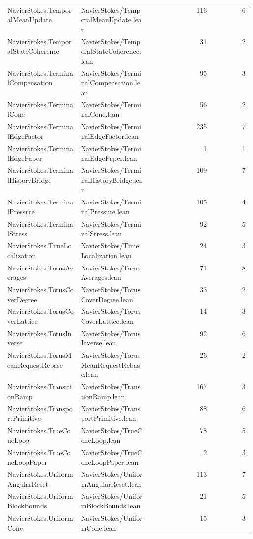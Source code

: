 \begin{longtable}{p{0.30\linewidth}p{0.28\linewidth}rr}
NavierStokes.TemporalMeanUpdate & NavierStokes/TemporalMeanUpdate.lean & 116 & 6\\
NavierStokes.TemporalStateCoherence & NavierStokes/TemporalStateCoherence.lean & 31 & 2\\
NavierStokes.TerminalCompensation & NavierStokes/TerminalCompensation.lean & 95 & 3\\
NavierStokes.TerminalCone & NavierStokes/TerminalCone.lean & 56 & 2\\
NavierStokes.TerminalEdgeFactor & NavierStokes/TerminalEdgeFactor.lean & 235 & 7\\
NavierStokes.TerminalEdgePaper & NavierStokes/TerminalEdgePaper.lean & 1 & 1\\
NavierStokes.TerminalHistoryBridge & NavierStokes/TerminalHistoryBridge.lean & 109 & 7\\
NavierStokes.TerminalPressure & NavierStokes/TerminalPressure.lean & 105 & 4\\
NavierStokes.TerminalStress & NavierStokes/TerminalStress.lean & 92 & 5\\
NavierStokes.TimeLocalization & NavierStokes/TimeLocalization.lean & 24 & 3\\
NavierStokes.TorusAverages & NavierStokes/TorusAverages.lean & 71 & 8\\
NavierStokes.TorusCoverDegree & NavierStokes/TorusCoverDegree.lean & 33 & 2\\
NavierStokes.TorusCoverLattice & NavierStokes/TorusCoverLattice.lean & 14 & 3\\
NavierStokes.TorusInverse & NavierStokes/TorusInverse.lean & 92 & 6\\
NavierStokes.TorusMeanRequestRebase & NavierStokes/TorusMeanRequestRebase.lean & 26 & 2\\
NavierStokes.TransitionRamp & NavierStokes/TransitionRamp.lean & 167 & 3\\
NavierStokes.TransportPrimitive & NavierStokes/TransportPrimitive.lean & 88 & 6\\
NavierStokes.TrueConeLoop & NavierStokes/TrueConeLoop.lean & 78 & 5\\
NavierStokes.TrueConeLoopPaper & NavierStokes/TrueConeLoopPaper.lean & 2 & 3\\
NavierStokes.UniformAngularReset & NavierStokes/UniformAngularReset.lean & 113 & 7\\
NavierStokes.UniformBlockBounds & NavierStokes/UniformBlockBounds.lean & 21 & 5\\
NavierStokes.UniformCone & NavierStokes/UniformCone.lean & 15 & 3\\

\end{longtable}
